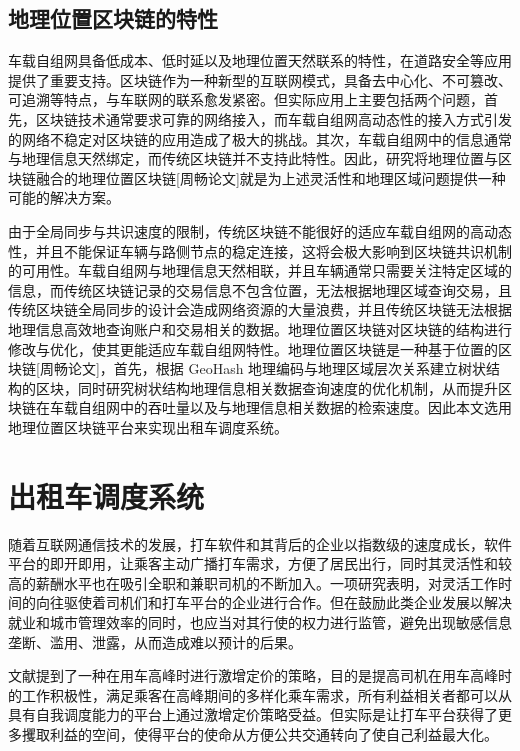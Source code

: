 \subsection{地理位置区块链的特性}
车载自组网具备低成本、低时延以及地理位置天然联系的特性，在道路安全等应用提供了重要支持。区块链作为一种新型的互联网模式，具备去中心化、不可篡改、可追溯等特点，与车联网的联系愈发紧密。但实际应用上主要包括两个问题，首先，区块链技术通常要求可靠的网络接入，而车载自组网高动态性的接入方式引发的网络不稳定对区块链的应用造成了极大的挑战。其次，车载自组网中的信息通常与地理信息天然绑定，而传统区块链并不支持此特性。因此，研究将地理位置与区块链融合的地理位置区块链[周畅论文]就是为上述灵活性和地理区域问题提供一种可能的解决方案。

由于全局同步与共识速度的限制，传统区块链不能很好的适应车载自组网的高动态性，并且不能保证车辆与路侧节点的稳定连接，这将会极大影响到区块链共识机制的可用性。车载自组网与地理信息天然相联，并且车辆通常只需要关注特定区域的信息，而传统区块链记录的交易信息不包含位置，无法根据地理区域查询交易，且传统区块链全局同步的设计会造成网络资源的大量浪费，并且传统区块链无法根据地理信息高效地查询账户和交易相关的数据。地理位置区块链对区块链的结构进行修改与优化，使其更能适应车载自组网特性。地理位置区块链是一种基于位置的区块链[周畅论文]，首先，根据 GeoHash 地理编码与地理区域层次关系建立树状结构的区块，同时研究树状结构地理信息相关数据查询速度的优化机制，从而提升区块链在车载自组网中的吞吐量以及与地理信息相关数据的检索速度。因此本文选用地理位置区块链平台来实现出租车调度系统。

\section{出租车调度系统}
随着互联网通信技术的发展，打车软件和其背后的企业以指数级的速度成长，软件平台的即开即用，让乘客主动广播打车需求，方便了居民出行，同时其灵活性和较高的薪酬水平也在吸引全职和兼职司机的不断加入。一项研究表明，对灵活工作时间的向往驱使着司机们和打车平台的企业进行合作。但在鼓励此类企业发展以解决就业和城市管理效率的同时，也应当对其行使的权力进行监管，避免出现敏感信息垄断、滥用、泄露，从而造成难以预计的后果。

文献提到了一种在用车高峰时进行激增定价的策略，目的是提高司机在用车高峰时的工作积极性，满足乘客在高峰期间的多样化乘车需求，所有利益相关者都可以从具有自我调度能力的平台上通过激增定价策略受益。但实际是让打车平台获得了更多攫取利益的空间，使得平台的使命从方便公共交通转向了使自己利益最大化。

